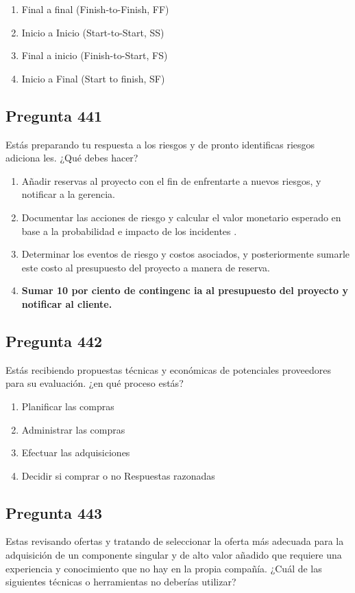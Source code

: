 \documentclass[11pt,a4paper]{article}
\begin{document}
\begin{enumerate}[label=\alph*)]
  \item Final a final (Finish-to-Finish, FF)
  \item Inicio a Inicio (Start-to-Start, SS)
  \item Final a inicio (Finish-to-Start, FS)
  \item Inicio a Final (Start to finish, SF)
\end{enumerate}

\subsection*{Pregunta 441}
Estás preparando tu respuesta a los riesgos y de pronto identificas riesgos adiciona les. ¿Qué debes hacer?

\begin{enumerate}[label=\alph*)]
  \item Añadir reservas al proyecto con el fin de enfrentarte a nuevos riesgos, y notificar a la gerencia.
  \item Documentar las acciones de riesgo y calcular el valor monetario esperado en base a la probabilidad e impacto de los incidentes .
  \item Determinar los eventos de riesgo y costos asociados, y posteriormente sumarle este costo al presupuesto del proyecto a manera de reserva.
  \item \textbf{Sumar 10 por ciento de contingenc ia al presupuesto del proyecto y notificar al cliente.}
\end{enumerate}

\subsection*{Pregunta 442}
Estás recibiendo propuestas técnicas y económicas de potenciales proveedores para su evaluación. ¿en qué proceso estás?

\begin{enumerate}[label=\alph*)]
  \item Planificar las compras
  \item Administrar las compras
  \item Efectuar las adquisiciones
  \item Decidir si comprar o no Respuestas razonadas
\end{enumerate}

\subsection*{Pregunta 443}
Estas revisando ofertas y tratando de seleccionar la oferta más adecuada para la adquisición de un componente singular y de alto valor añadido que requiere una experiencia y conocimiento que no hay en la propia compañía. ¿Cuál de las siguientes técnicas o herramientas no deberías utilizar?
\end{document}
